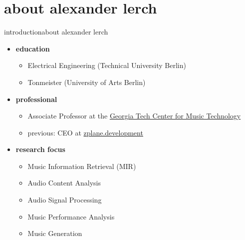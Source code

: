 

\subtitle{module 0.0: course introduction}


	

    \section[about]{about alexander lerch}
        \begin{frame}{introduction}{about alexander lerch}
            \begin{itemize}
                \item   \textbf{education}
                    \begin{itemize}
                        \item   Electrical Engineering (Technical University Berlin)
                        \item   Tonmeister (University of Arts Berlin)
                    \end{itemize}
        \smallskip
                \item   \textbf{professional}
                    \begin{itemize}
                        \item   Associate Professor at the \href{http://gtcmt.gatech.edu}{Georgia Tech Center for Music Technology}
                        \item   previous: CEO at \href{http://www.zplane.de}{zplane.development}
                    \end{itemize}
        \smallskip
                \item   \textbf{research focus}
                    \begin{itemize}
                        \item   Music Information Retrieval (MIR)
                        \item   Audio Content Analysis
                        \item   Audio Signal Processing
                        \item   Music Performance Analysis
                        \item   Music Generation
                    \end{itemize}
            \end{itemize}
            
        \end{frame}


